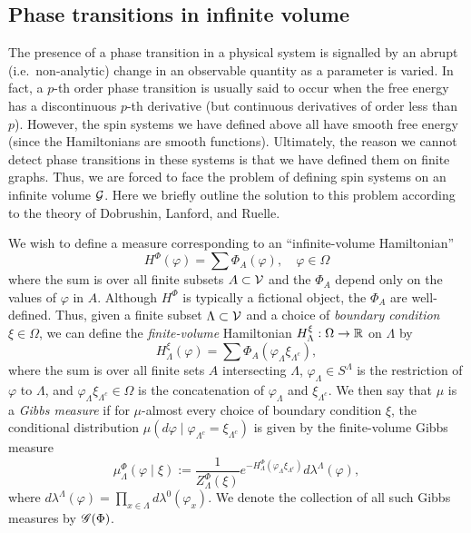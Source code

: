 \subsection{Phase transitions in infinite volume}

The presence of a phase transition in a physical system is signalled by an abrupt
(i.e.\ non-analytic) change in an observable quantity as a parameter is varied. In fact,
a $p$-th order phase transition is usually said to occur when the free energy
has a discontinuous $p$-th derivative (but continuous derivatives of order less than $p$).
However, the spin systems we have defined above all have smooth free energy (since the
Hamiltonians are smooth functions). Ultimately, the reason we cannot detect phase
transitions in these systems is that we have defined them on finite graphs. Thus, we
are forced to face the problem of defining spin systems on an infinite volume $\mathcal{G}$.
Here we briefly outline the solution to this problem according to the theory of Dobrushin,
Lanford, and Ruelle.

We wish to define a measure corresponding to an ``infinite-volume Hamiltonian''
\begin{equation}
H^\Phi(\varphi) = \sum \Phi_A(\varphi),
  \quad
\varphi \in \Omega
\end{equation}
where the sum is over all finite subsets $A \subset \mathcal{V}$ and the $\Phi_A$ depend only on the
values of $\varphi$ in $A$. Although $H^\Phi$ is typically a fictional object, the $\Phi_A$
are well-defined. Thus, given a finite subset $\Lambda\subset\mathcal{V}$ and a choice of
\emph{boundary condition} $\xi\in\Omega$,
we can define the \emph{finite-volume} Hamiltonian $H^\xi_\Lambda : \Omega \rightarrow {\mathbb R}$ on $\Lambda$ by
\begin{equation}
H^\xi_\Lambda(\varphi) = \sum \Phi_A(\varphi_{\Lambda} \xi_{\Lambda^c}),
\end{equation}
where the sum is over all finite sets $A$ intersecting $\Lambda$, $\varphi_{\Lambda} \in S^{\Lambda}$
is the restriction of $\varphi$ to $\Lambda$, and $\varphi_{\Lambda} \xi_{\Lambda^c} \in \Omega$
is the concatenation of $\varphi_{\Lambda}$ and $\xi_{\Lambda^c}$.
We then say that $\mu$ is a \emph{Gibbs measure} if for $\mu$-almost
every choice of boundary condition $\xi$, the conditional distribution
$\mu(d\varphi \mid \varphi_{\Lambda^c} = \xi_{\Lambda^c})$ is given by the finite-volume Gibbs
measure
\begin{equation}
\mu^\Phi_\Lambda(\varphi \mid \xi)
  :=
\frac{1}{Z^\Phi_\Lambda(\xi)}
e^{-H^\Phi_\Lambda(\varphi_\Lambda \xi_{\Lambda^c})}
d\lambda^\Lambda(\varphi),
\end{equation}
where $d\lambda^\Lambda(\varphi) = \prod_{x\in\Lambda} d\lambda^0(\varphi_x)$.
We denote the collection of all such Gibbs measures by $\mathscr{G}(\Phi)$.

